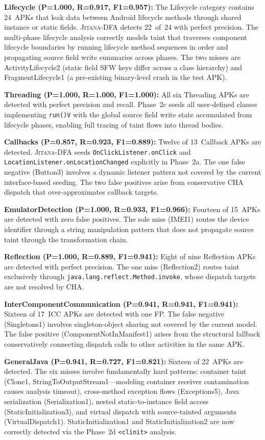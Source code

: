 \documentclass[conference]{IEEEtran}
\begin{document}
\textbf{Lifecycle (P=1.000, R=0.917, F1=0.957):} The Lifecycle category
contains 24~APKs that leak data between Android lifecycle methods through shared
instance or static fields. \textsc{Jitana-DFA} detects 22~of~24 with perfect
precision. The multi-phase lifecycle analysis correctly models taint that
traverses component lifecycle boundaries by running lifecycle method sequences in
order and propagating source field write summaries across phases. The two misses
are ActivityLifecycle2 (static field SFW keys differ across a class hierarchy)
and FragmentLifecycle1 (a pre-existing binary-level crash in the test APK).

\textbf{Threading (P=1.000, R=1.000, F1=1.000):} All six Threading APKs are
detected with perfect precision and recall. Phase~2c seeds all user-defined
classes implementing \texttt{run()V} with the global source field write state
accumulated from lifecycle phases, enabling full tracing of taint flows into
thread bodies.

\textbf{Callbacks (P=0.857, R=0.923, F1=0.889):} Twelve of 13~Callback APKs
are detected. \textsc{Jitana-DFA} seeds \texttt{OnClickListener.onClick} and
\texttt{LocationListener.onLocationChanged} explicitly in Phase~2a. The one false
negative (Button3) involves a dynamic listener pattern not covered by the current
interface-based seeding. The two false positives arise from conservative CHA
dispatch that over-approximates callback targets.

\textbf{EmulatorDetection (P=1.000, R=0.933, F1=0.966):} Fourteen of 15~APKs
are detected with zero false positives. The sole miss (IMEI1) routes the device
identifier through a string manipulation pattern that does not propagate source
taint through the transformation chain.

\textbf{Reflection (P=1.000, R=0.889, F1=0.941):} Eight of nine Reflection APKs
are detected with perfect precision. The one miss (Reflection2) routes taint
exclusively through \texttt{java.lang.reflect.Method.invoke}, whose dispatch
targets are not resolved by CHA.

\textbf{InterComponentCommunication (P=0.941, R=0.941, F1=0.941):} Sixteen of
17~ICC APKs are detected with one FP. The false negative (Singletons1) involves
singleton-object sharing not covered by the current model. The false positive
(ComponentNotInManifest1) arises from the structural fallback conservatively
connecting dispatch calls to other activities in the same APK.

\textbf{GeneralJava (P=0.941, R=0.727, F1=0.821):} Sixteen of 22~APKs are
detected. The six misses involve fundamentally hard patterns: container taint
(Clone1, StringToOutputStream1---modeling container receiver contamination causes
analysis timeout), cross-method exception flows (Exceptions5), Java serialization
(Serialization1), nested static-to-instance field access
(StaticInitialization3), and virtual dispatch with source-tainted arguments
(VirtualDispatch1). StaticInitialization1 and StaticInitialization2 are now
correctly detected via the Phase~2d \texttt{<clinit>} analysis.
\end{document}

